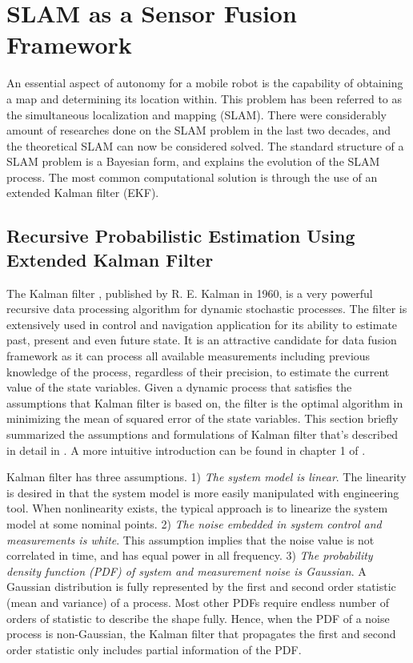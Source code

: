\section{SLAM as a Sensor Fusion Framework}
\label{sec:SLAM}
An essential aspect of autonomy for a mobile robot is the capability
of obtaining a map and determining its location within. This problem
has been referred to as the simultaneous localization and mapping
(SLAM). There were considerably amount of researches done on the SLAM
problem in the last two decades, and the theoretical SLAM can now be
considered solved. The standard structure of a SLAM problem is a
Bayesian form, and explains the evolution of the SLAM process. The most
common computational solution is through the use of an extended
Kalman filter (EKF).

\subsection{Recursive Probabilistic Estimation Using Extended Kalman Filter}
\label{sec:SLAM_using_EKF}

The Kalman filter \cite{kalman_new_1960}, published by R. E. Kalman in
1960, is a very powerful recursive data processing algorithm for
dynamic stochastic processes. The filter is extensively used in
control and navigation application for its ability to estimate past,
present and even future state. It is an attractive candidate for data
fusion framework as it can process all available measurements
including previous knowledge of the process, regardless of their
precision, to estimate the current value of the state variables.
Given a dynamic process that satisfies the assumptions that Kalman
filter is based on, the filter is the optimal algorithm in minimizing
the mean of squared error of the state variables. This section briefly
summarized the assumptions and formulations of Kalman filter that's
described in detail in \cite{sorenson_least-squares_1970}
\cite{analytic_sciences_corporation_applied_1974}
\cite{grewal_kalman_1993} \cite{lewis_optimal_1986}
\cite{brown_introduction_1993}. A more intuitive introduction can be
found in chapter 1 of \cite{maybeck_stochastic_1979}.


Kalman filter has three assumptions. 1) \textit{The system model is
  linear}. The linearity is desired in that the system model is more
easily manipulated with engineering tool. When nonlinearity exists,
the typical approach is to linearize the system model at some nominal
points. 2) \textit{The noise embedded in system control and
  measurements is white}. This assumption implies that the noise value
is not correlated in time, and has equal power in all frequency. 3)
\textit{The probability density function (PDF) of system and
  measurement noise is Gaussian}. A Gaussian distribution is fully
represented by the first and second order statistic (mean and
variance) of a process. Most other PDFs require endless number of
orders of statistic to describe the shape fully. Hence, when the PDF
of a noise process is non-Gaussian, the Kalman filter that propagates
the first and second order statistic only includes partial information
of the PDF.

